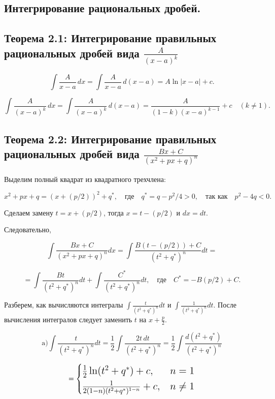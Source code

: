 {
\subsection{Интегрирование рациональных дробей.}

\subsection*{Теорема 2.1: Интегрирование правильных рациональных дробей вида \( \frac{A}{(x-a)^k} \)}
\setcounter{equation}{0}
\begin{equation}
\int \frac{A}{x-a} \,dx = \int \frac{A}{x-a} \,d(x-a) = A \ln |x-a| + c.
\end{equation}

\begin{equation}
\int \frac{A}{(x-a)^k} \,dx = \int \frac{A}{(x-a)^k} \,d(x-a) = \frac{A}{(1-k)(x-a)^{k-1}} + c \quad (k \neq 1).
\end{equation}

\subsection*{Теорема 2.2: Интегрирование правильных рациональных дробей вида \( \frac{Bx + C}{(x^2 + px + q)^n} \)}

Выделим полный квадрат из квадратного трехчлена:


\[
x^2 + px + q = (x + (p/2))^2 + q^*, \quad \text{где} \quad q^* = q - p^2/4 > 0, \quad \text{так как} \quad p^2 - 4q < 0.
\]

Сделаем замену \( t = x + (p/2) \), тогда \( x = t - (p/2) \) и \( dx = dt \).

Следовательно,


\[
\int \frac{Bx + C}{(x^2 + px + q)^n} dx = \int \frac{B(t - (p/2)) + C}{(t^2 + q^*)^n} dt =
\]

\[
= \int \frac{Bt}{(t^2 + q^*)^n} dt + \int \frac{C^*}{(t^2 + q^*)^n} dt, \quad \text{где} \quad C^* = - B(p/2) + C.
\]


Разберем, как вычисляются интегралы \( \int \frac{t}{(t^2 + q^*)^n} dt \) и \( \int \frac{1}{(t^2 + q^*)^n} dt \). После вычисления интегралов следует заменить \( t \) на \( x + \frac{p}{2} \).



\[
\text{a)}\int \frac{t}{(t^2 + q^*)^n} dt = \frac{1}{2} \int \frac{2t \, dt}{(t^2 + q^*)^n} = \frac{1}{2} \int \frac{d(t^2 + q^*)}{(t^2 + q^*)^n}
\]

\[
\Large = \begin{cases} 
\frac{1}{2} \ln(t^2 + q^*) + c, & n = 1 \\ 
\frac{1}{2(1 - n)(t^2 + q^*)^{1 - n}} + c, & n \neq 1 
\end{cases}
\]

}

